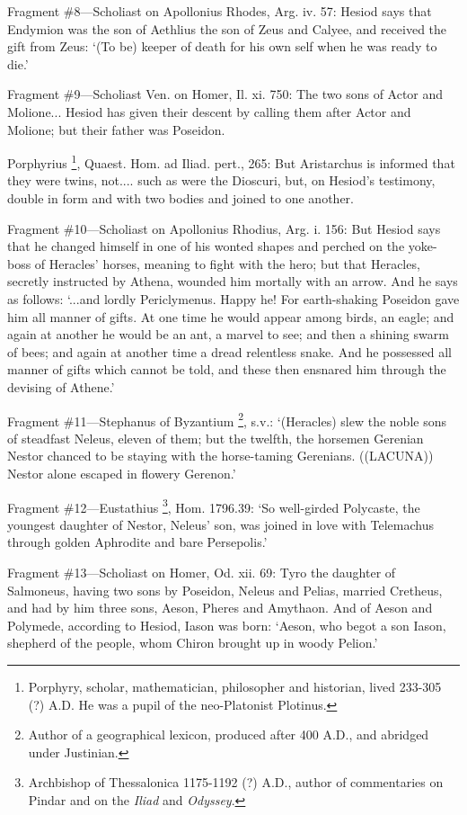 Fragment \#8—Scholiast on Apollonius Rhodes, Arg. iv. 57: Hesiod says that
Endymion was the son of Aethlius the son of Zeus and Calyee, and received the
gift from Zeus: ‘(To be) keeper of death for his own self when he was
ready to die.’

Fragment \#9—Scholiast Ven. on Homer, Il. xi. 750: The two sons of Actor
and Molione... Hesiod has given their descent by calling them after Actor and
Molione; but their father was Poseidon.

Porphyrius \footnote{Porphyry, scholar,
mathematician, philosopher and historian, lived 233-305 (?) A.D. He was a pupil
of the neo-Platonist Plotinus.}, Quaest. Hom. ad Iliad. pert.,
265: But Aristarchus is informed that they were twins, not.... such as were the
Dioscuri, but, on Hesiod’s testimony, double in form and with two bodies
and joined to one another.

Fragment \#10—Scholiast on Apollonius Rhodius, Arg. i. 156: But Hesiod
says that he changed himself in one of his wonted shapes and perched on the
yoke-boss of Heracles’ horses, meaning to fight with the hero; but that
Heracles, secretly instructed by Athena, wounded him mortally with an arrow.
And he says as follows: ‘...and lordly Periclymenus. Happy he! For
earth-shaking Poseidon gave him all manner of gifts. At one time he would
appear among birds, an eagle; and again at another he would be an ant, a marvel
to see; and then a shining swarm of bees; and again at another time a dread
relentless snake. And he possessed all manner of gifts which cannot be told,
and these then ensnared him through the devising of Athene.’

Fragment \#11—Stephanus of Byzantium \footnote{Author of a geographical
lexicon, produced after 400 A.D., and abridged under Justinian.}, s.v.:
‘(Heracles) slew the noble sons of steadfast Neleus, eleven of them; but
the twelfth, the horsemen Gerenian Nestor chanced to be staying with the
horse-taming Gerenians. ((LACUNA)) Nestor alone escaped in flowery
Gerenon.’

Fragment \#12—Eustathius \footnote{Archbishop of Thessalonica
1175-1192 (?) A.D., author of commentaries on Pindar and on the
\emph{Iliad} and \emph{Odyssey}.}, Hom. 1796.39: ‘So
well-girded Polycaste, the youngest daughter of Nestor, Neleus’ son, was
joined in love with Telemachus through golden Aphrodite and bare
Persepolis.’

Fragment \#13—Scholiast on Homer, Od. xii. 69: Tyro the daughter of
Salmoneus, having two sons by Poseidon, Neleus and Pelias, married Cretheus,
and had by him three sons, Aeson, Pheres and Amythaon. And of Aeson and
Polymede, according to Hesiod, Iason was born: ‘Aeson, who begot a son
Iason, shepherd of the people, whom Chiron brought up in woody Pelion.’

